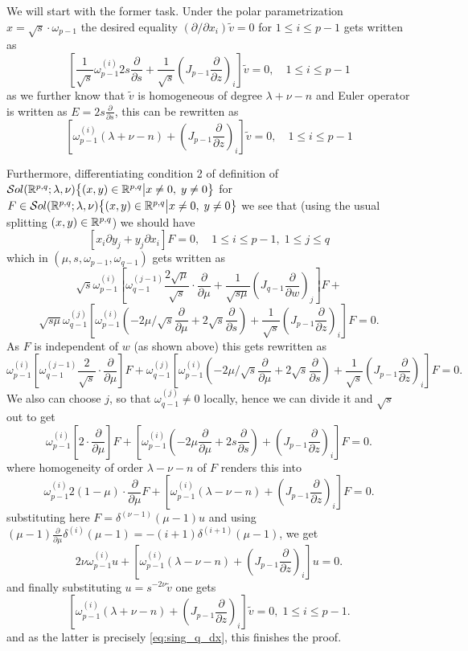 \documentclass[10pt]{article} %
\theoremstyle{definition}
\theoremstyle{remark}
\begin{document}
\begin{myproof}
	We will start with the former task. Under the polar parametrization $x=\sqrt{s}
	\cdot \omega_{p-1}$ the desired equality $(\partial/\partial x_i)\tilde{v}=0$ for $1\leq i\leq p-1$
	gets written as \[ \left[ \frac{1}{\sqrt{s}}\omega_{p-1}^{(i)}2s\frac{\partial}{\partial s}
	+\frac{1}{\sqrt{s}}\left( J_{p-1}\frac{\partial}{\partial z} \right)_{i}\right]\tilde{v}=0,\quad 1\leq i\leq p-1\]
	as we further know that $\tilde{v}$ is homogeneous of degree $\lambda+\nu-n$ and Euler operator is written as $E=2s\frac{
	\partial}{\partial s}$, this can be rewritten as
	\begin{equation}
	\left[ \omega_{p-1}^{(i)}(\lambda+\nu-n)
		+\left( J_{p-1}\frac{\partial}{\partial z} \right)_{i}\right]\tilde{v}=0,\quad 1\leq i\leq p-1
		\label{eq:sing_q_dx}
	\end{equation}

	Furthermore, differentiating condition 2 of definition of $\mathcal{S}ol( \mathbb{R}^{p,q};\lambda,\nu){\left\{(x,y)\in\mathbb{R}^{p,q}\big| x\neq0,\;y\neq0\right\}}$ for $F\in\mathcal{S}ol( \mathbb{R}^{p,q};\lambda,\nu){\left\{(x,y)\in\mathbb{R}^{p,q}\big| x\neq0,\;y\neq0\right\}}$ we see that (using the usual
	splitting $(x,y)\in\mathbb{R}^{p,q}$) we should have
	\[ \left[ x_i\partial y_j + y_j\partial x_i \right]F=0,\quad 1\le i\le p-1,\;1\leq j\leq q\]
	which in $(\mu,s,\omega_{p-1},\omega_{q-1})$ gets written as
	\[ \sqrt{s}\omega^{(i)}_{p-1}\left[ \omega^{(j-1)}_{q-1}\frac{2\sqrt{\mu}}{\sqrt{s}}\cdot\frac{\partial}{\partial\mu}+
	\frac{1}{\sqrt{s\mu}}\left( J_{q-1}\frac{\partial}{\partial w} \right)_j\right]F+\]\[
	\sqrt{s\mu}\omega^{(j)}_{q-1}\left[ \omega_{p-1}^{(i)}\left( -2\mu/\sqrt{s}\frac{\partial}{\partial\mu}+2\sqrt{s}\frac
	{\partial}{\partial s} \right)+\frac{1}{\sqrt{s}}\left( J_{p-1}\frac{\partial}{\partial z} \right)_i \right]F=0.\]
	As $F$ is independent of $w$ (as shown above) this gets rewritten as
	\[ \omega^{(i)}_{p-1}\left[ \omega^{(j-1)}_{q-1}\frac{2}{\sqrt{s}}\cdot\frac{\partial}{\partial\mu}
	\right]F+
	\omega^{(j)}_{q-1}\left[ \omega_{p-1}^{(i)}\left( -2\mu/\sqrt{s}\frac{\partial}{\partial\mu}+2\sqrt{s}\frac
	{\partial}{\partial s} \right)+\frac{1}{\sqrt{s}}\left( J_{p-1}\frac{\partial}{\partial z} \right)_i \right]F=0.\]
	We also can choose $j$, so that $\omega^{(j)}_{q-1}\neq0$ locally, hence we can divide it and $\sqrt{s}$ out to get
	\[ \omega^{(i)}_{p-1}\left[ {2}\cdot\frac{\partial}{\partial\mu}
	\right]F+
	\left[ \omega_{p-1}^{(i)}\left( -2\mu\frac{\partial}{\partial\mu}+2{s}\frac
	{\partial}{\partial s} \right)+\left( J_{p-1}\frac{\partial}{\partial z} \right)_i \right]F=0.\]
	where homogeneity of order $\lambda-\nu-n$
	of $F$ renders this into
	\[ \omega^{(i)}_{p-1} {2}(1-\mu)\cdot\frac{\partial}{\partial\mu}F+
	\left[ \omega_{p-1}^{(i)}\left( \lambda-\nu-n
	\right)+\left( J_{p-1}\frac{\partial}{\partial z} \right)_i \right]F=0.\]
	substituting here $F=\delta^{(\nu-1)}(\mu-1)u$ and using $(\mu-1)\frac{\partial}{\partial\mu}\delta^{(i)}(\mu-1)=
	-(i+1)\delta^{(i+1)}(\mu-1)$, we get
	\[ 2\nu\omega^{(i)}_{p-1}u+\left[ \omega_{p-1}^{(i)}\left( \lambda-\nu-n
	\right)+\left( J_{p-1}\frac{\partial}{\partial z} \right)_i \right]u=0.\]
	and finally substituting $u=s^{-2\nu}\tilde{v}$ one gets
	\[ \left[ \omega_{p-1}^{(i)}\left( \lambda+\nu-n
	\right)+\left( J_{p-1}\frac{\partial}{\partial z} \right)_i \right]\tilde{v}=0,\;1\leq i\leq p-1.\]
	and as the latter is precisely \eqref{eq:sing_q_dx}, this finishes the proof.
\end{myproof}


\end{document}

